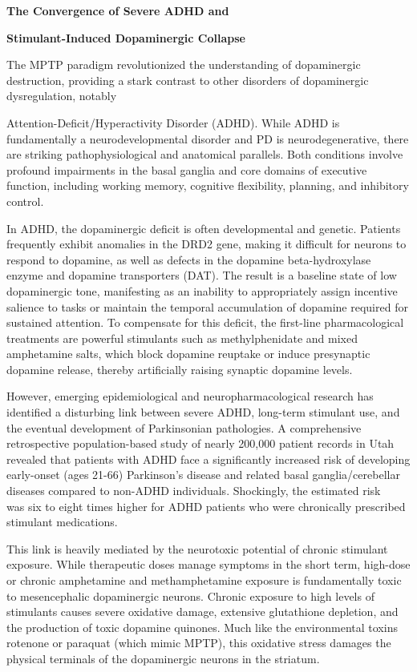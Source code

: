 \textbf{The Convergence of Severe ADHD and}

\textbf{Stimulant-Induced Dopaminergic Collapse}

The MPTP paradigm revolutionized the understanding of dopaminergic destruction, providing a stark contrast to other disorders of dopaminergic dysregulation, notably

Attention-Deficit/Hyperactivity Disorder (ADHD). While ADHD is fundamentally a neurodevelopmental disorder and PD is neurodegenerative, there are striking pathophysiological and anatomical parallels. Both conditions involve profound impairments in the basal ganglia and core domains of executive function, including working memory, cognitive flexibility, planning, and inhibitory control.

In ADHD, the dopaminergic deficit is often developmental and genetic. Patients frequently exhibit anomalies in the DRD2 gene, making it difficult for neurons to respond to dopamine, as well as defects in the dopamine beta-hydroxylase enzyme and dopamine transporters (DAT). The result is a baseline state of low dopaminergic tone, manifesting as an inability to appropriately assign incentive salience to tasks or maintain the temporal accumulation of dopamine required for sustained attention. To compensate for this deficit, the first-line pharmacological treatments are powerful stimulants such as methylphenidate and mixed amphetamine salts, which block dopamine reuptake or induce presynaptic dopamine release, thereby artificially raising synaptic dopamine levels.

However, emerging epidemiological and neuropharmacological research has identified a disturbing link between severe ADHD, long-term stimulant use, and the eventual development of Parkinsonian pathologies. A comprehensive retrospective population-based study of nearly 200,000 patient records in Utah revealed that patients with ADHD face a significantly increased risk of developing early-onset (ages 21-66) Parkinson's disease and related basal ganglia/cerebellar diseases compared to non-ADHD individuals. Shockingly, the estimated risk\\
was six to eight times higher for ADHD patients who were chronically prescribed stimulant medications.

This link is heavily mediated by the neurotoxic potential of chronic stimulant exposure. While therapeutic doses manage symptoms in the short term, high-dose or chronic amphetamine and methamphetamine exposure is fundamentally toxic to mesencephalic dopaminergic neurons. Chronic exposure to high levels of stimulants causes severe oxidative damage, extensive glutathione depletion, and the production of toxic dopamine quinones. Much like the environmental toxins rotenone or paraquat (which mimic MPTP), this oxidative stress damages the physical terminals of the dopaminergic neurons in the striatum.

